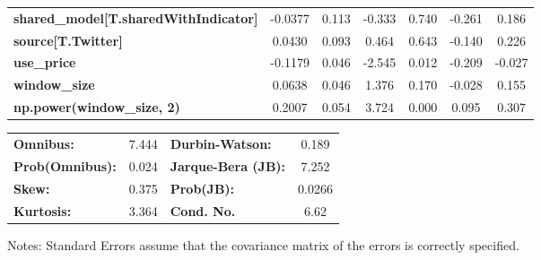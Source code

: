 \begin{center}
\begin{tabular}{lcccccc}
\textbf{shared\_model[T.sharedWithIndicator]} &      -0.0377  &        0.113     &    -0.333  &         0.740        &       -0.261    &        0.186     \\
\textbf{source[T.Twitter]}                    &       0.0430  &        0.093     &     0.464  &         0.643        &       -0.140    &        0.226     \\
\textbf{use\_price}                           &      -0.1179  &        0.046     &    -2.545  &         0.012        &       -0.209    &       -0.027     \\
\textbf{window\_size}                         &       0.0638  &        0.046     &     1.376  &         0.170        &       -0.028    &        0.155     \\
\textbf{np.power(window\_size, 2)}            &       0.2007  &        0.054     &     3.724  &         0.000        &        0.095    &        0.307     \\
\bottomrule
\end{tabular}
\begin{tabular}{lclc}
\textbf{Omnibus:}       &  7.444 & \textbf{  Durbin-Watson:     } &    0.189  \\
\textbf{Prob(Omnibus):} &  0.024 & \textbf{  Jarque-Bera (JB):  } &    7.252  \\
\textbf{Skew:}          &  0.375 & \textbf{  Prob(JB):          } &   0.0266  \\
\textbf{Kurtosis:}      &  3.364 & \textbf{  Cond. No.          } &     6.62  \\
\bottomrule
\end{tabular}
\end{center}

Notes: \newline
 [1] Standard Errors assume that the covariance matrix of the errors is correctly specified.
